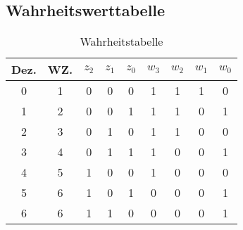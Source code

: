 \subsection{Wahrheitswerttabelle}
\begin{table}[H]
    \centering
    \def\arraystretch{1.3}
    \begin{tabular}{|c|c!{\vrule width 1.5pt}c|c|c!{\vrule width 1.5pt}c|c|c|c|}
        \hline
        Dez. & WZ. & $z_2$ & $z_1$ & $z_0$ & $w_3$ & $w_2$ & $w_1$ & $w_0$ \\
            & 1   & 0     & 0     & 0     & 1     & 1     & 1     & 0     \\
        1    & 2   & 0     & 0     & 1     & 1     & 1     & 0     & 1     \\
        2    & 3   & 0     & 1     & 0     & 1     & 1     & 0     & 0     \\
        3    & 4   & 0     & 1     & 1     & 1     & 0     & 0     & 1     \\
        4    & 5   & 1     & 0     & 0     & 1     & 0     & 0     & 0     \\
        5    & 6   & 1     & 0     & 1     & 0     & 0     & 0     & 1     \\
        6    & 6   & 1     & 1     & 0     & 0     & 0     & 0     & 1     \\
        \hline
    \end{tabular}
    \caption{Wahrheitstabelle}
    \label{tab:wahrheitstabelle}
\end{table}

